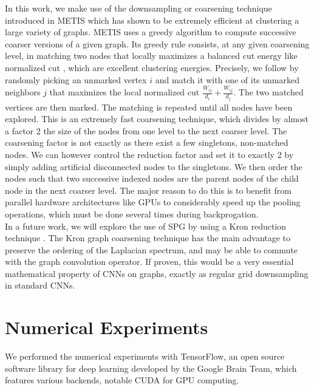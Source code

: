 \documentclass{article}
\begin{document}
In this work, we make use of the downsampling or coarsening technique introduced in METIS \cite{art:DhillonGuanKulis07Graclus,art:KarypisKumar98Metis} which has shown to be extremely efficient at clustering a large variety of graphs. METIS uses a greedy algorithm to compute successive coarser versions of a given graph. Its greedy rule consists, at any given coarsening level, in matching two nodes that locally maximizes a balanced cut energy like normalized cut \cite{art:ShiMalik00NCut}, which are excellent clustering energies. Precisely, we follow \cite{art:BressonHuLaurentSzlamvonBrecht14Reseed} by randomly picking an unmarked vertex $i$ and match it with one of its unmarked neighbors $j$ that maximizes the local normalized cut $\frac{W_{ij}}{d_i}+\frac{W_{ij}}{d_j}$. The two matched vertices are then marked. The matching is repeated until all nodes have been explored. This is an extremely fast coarsening technique, which divides by almost a factor 2 the size of the nodes from one level to the next coarser level. The coarsening factor is not exactly as there exist a few singletons, non-matched nodes. We can however control the reduction factor and set it to exactly 2 by simply adding artificial disconnected nodes to the singletons. We then order the nodes such that two successive indexed nodes are the parent nodes of the child node in the next coarser level. The major reason to do this is to benefit from parallel hardware architectures like GPUs to considerably speed up the pooling operations, which must be done several times during backprogation.\\
In a future work, we will explore the use of SPG by using a Kron reduction technique \cite{art:ShumanFarajiVandergheynst16PyramTrans}. The Kron graph coarsening technique has the main advantage to preserve the ordering of the Laplacian spectrum, and may be able to commute with the graph convolution operator. If proven, this would be a very essential mathematical property of CNNs on graphs, exactly as regular grid downsampling in standard CNNs. 









\section{Numerical Experiments}
\vspace{-0.4cm}
We performed the numerical experiments with TensorFlow, an open source software library for deep learning developed by the Google Brain Team, which features various backends, notable CUDA for GPU computing.
 
\end{document}

